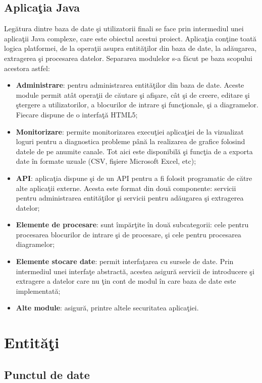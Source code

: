 \subsection{Aplicaţia Java}
Legătura dintre baza de date şi utilizatorii finali se face prin intermediul unei aplicaţii Java complexe, care este obiectul acestui proiect. Aplicaţia conţine toată logica platformei, de la operaţii asupra entităţilor din baza de date, la adăugarea,  extragerea şi procesarea datelor. 
Separarea modulelor s-a făcut pe baza scopului acestora astfel:
\begin{itemize}
	\item \textbf{Administrare}: pentru administrarea entităţilor din baza de date. Aceste module permit atât operaţii de căutare şi afişare, cât şi de creere, editare şi ştergere a utilizatorilor, a blocurilor de intrare şi funcţionale, şi a diagramelor. Fiecare dispune de o interfaţă HTML5;
	\item \textbf{Monitorizare}: permite monitorizarea execuţiei aplicaţiei de la vizualizat loguri pentru a diagnostica probleme până la realizarea de grafice folosind datele de pe anumite canale. Tot aici este disponibilă şi funcţia de a exporta date în formate uzuale (CSV, fişiere Microsoft Excel, etc);
	\item \textbf{API}: aplicaţia dispune şi de un API pentru a fi folosit programatic de către alte aplicaţii externe. Acesta este format din două componente: servicii pentru administrarea entităţilor şi servicii pentru adăugarea şi extragerea datelor;
	\item \textbf{Elemente de procesare}: sunt împărţite în două subcategorii: cele pentru procesarea blocurilor de intrare şi de procesare, şi cele pentru procesarea diagramelor;
	\item \textbf{Elemente stocare date}: permit interfaţarea cu sursele de date. Prin intermediul unei interfaţe abstractă, acestea asigură servicii de introducere şi extragere a datelor care nu ţin cont de modul în care baza de date este implementată;
	\item \textbf{Alte module}: asigură, printre altele securitatea aplicaţiei.
\end{itemize}

\section{Entităţi}
\subsection{Punctul de date}

